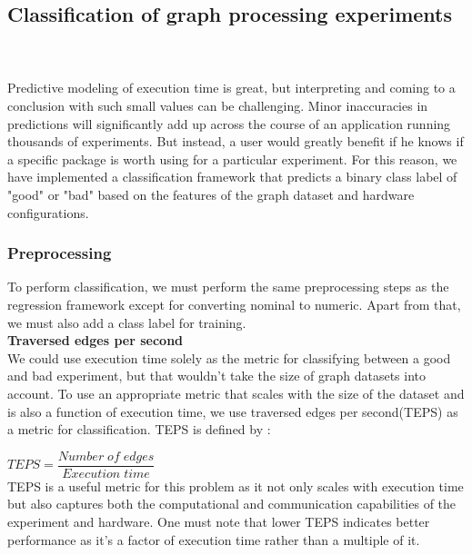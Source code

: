 
\subsection{Classification of graph processing experiments}\\ \\
Predictive modeling of execution time is great, but interpreting and coming to a conclusion with such small values can be challenging. Minor inaccuracies in predictions will significantly add up across the course of an application running thousands of experiments. But instead, a user would greatly benefit if he knows if a specific package is worth using for a particular experiment. For this reason, we have implemented a classification framework that predicts a binary class label of "good" or "bad" based on the features of the graph dataset and hardware configurations.  

\subsubsection{Preprocessing}
To perform classification, we must perform the same preprocessing steps as the regression framework except for converting nominal to numeric. Apart from that, we must also add a class label for training. \\
\textbf{Traversed edges per second}\\
We could use execution time solely as the metric for classifying between a good and bad experiment, but that wouldn't take the size of graph datasets into account. To use an appropriate metric that scales with the size of the dataset and is also a function of execution time, we use traversed edges per second(TEPS) as a metric for classification. TEPS is defined by :


    $TEPS= \dfrac{Number\;of\; edges}{Execution\;time}$ \\


TEPS is a useful metric for this problem as it not only scales with execution time but also captures both the computational and communication capabilities of the experiment and hardware. One must note that lower TEPS indicates better performance as it's a factor of execution time rather than a multiple of it. 

